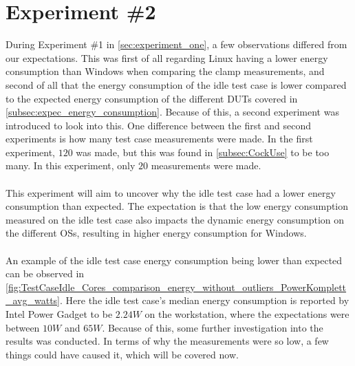 \section{Experiment \#2}\label{sec:experiment_two}

During Experiment \#1 in \cref{sec:experiment_one}, a few observations differed from our expectations. This was first of all regarding Linux having a lower energy consumption than Windows when comparing the clamp measurements, and second of all that the energy consumption of the idle test case is lower compared to the expected energy consumption of the different DUTs covered in \cref{subsec:expec_energy_consumption}. Because of this, a second experiment was introduced to look into this. One difference between the first and second experiments is how many test case measurements were made. In the first experiment, $120$ was made, but this was found in \cref{subsec:CockUse} to be too many. In this experiment, only $20$ measurements were made. 

\paragraph*{}
This experiment will aim to uncover why the idle test case had a lower energy consumption than expected. The expectation is that the low energy consumption measured on the idle test case also impacts the dynamic energy consumption on the different OSs, resulting in higher energy consumption for Windows.

\paragraph*{}
An example of the idle test case energy consumption being lower than expected can be observed in \cref{fig:TestCaseIdle_Cores_comparison_energy_without_outliers_PowerKomplett_avg_watts}. Here the idle test case's median energy consumption is reported by Intel Power Gadget to be $2.24W$ on the workstation, where the expectations were between $10W$ and $65W$. Because of this, some further investigation into the results was conducted. In terms of why the measurements were so low, a few things could have caused it, which will be covered now.



